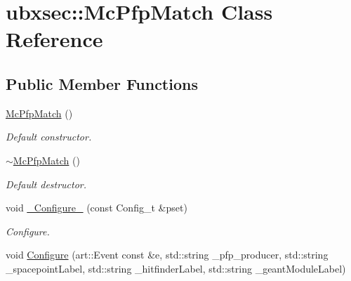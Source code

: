 \hypertarget{classubxsec_1_1McPfpMatch}{\section{ubxsec\-:\-:\-Mc\-Pfp\-Match \-Class \-Reference}
\label{classubxsec_1_1McPfpMatch}
}
\subsection*{\-Public \-Member \-Functions}
\begin{DoxyCompactItemize}
\item 
\hypertarget{classubxsec_1_1McPfpMatch_aea3e9923fdf8855d5798015b36f2d516}{\hyperlink{classubxsec_1_1McPfpMatch_aea3e9923fdf8855d5798015b36f2d516}{\-Mc\-Pfp\-Match} ()}\label{classubxsec_1_1McPfpMatch_aea3e9923fdf8855d5798015b36f2d516}

\begin{DoxyCompactList}\small\item\em \-Default constructor. \end{DoxyCompactList}\item 
\hypertarget{classubxsec_1_1McPfpMatch_a3fa822d7321aca21a0ad42e692a29bf2}{\hyperlink{classubxsec_1_1McPfpMatch_a3fa822d7321aca21a0ad42e692a29bf2}{$\sim$\-Mc\-Pfp\-Match} ()}\label{classubxsec_1_1McPfpMatch_a3fa822d7321aca21a0ad42e692a29bf2}

\begin{DoxyCompactList}\small\item\em \-Default destructor. \end{DoxyCompactList}\item 
\hypertarget{classubxsec_1_1McPfpMatch_aa6578a20f7a8194fae3caa2b19044e40}{void \hyperlink{classubxsec_1_1McPfpMatch_aa6578a20f7a8194fae3caa2b19044e40}{\-\_\-\-Configure\-\_\-} (const \-Config\-\_\-t \&pset)}\label{classubxsec_1_1McPfpMatch_aa6578a20f7a8194fae3caa2b19044e40}

\begin{DoxyCompactList}\small\item\em \-Configure. \end{DoxyCompactList}\item 
\hypertarget{classubxsec_1_1McPfpMatch_a15cea806e5a1b12bf2e187d5d26c528d}{void \hyperlink{classubxsec_1_1McPfpMatch_a15cea806e5a1b12bf2e187d5d26c528d}{\-Configure} (art\-::\-Event const \&e, std\-::string \-\_\-pfp\-\_\-producer, std\-::string \-\_\-spacepoint\-Label, std\-::string \-\_\-hitfinder\-Label, std\-::string \-\_\-geant\-Module\-Label)}\label{classubxsec_1_1McPfpMatch_a15cea806e5a1b12bf2e187d5d26c528d}


\end{DoxyCompactItemize}
